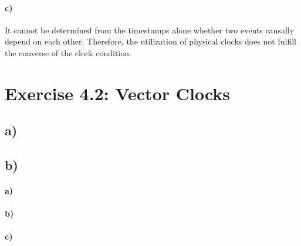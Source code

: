 \documentclass[12pt,a4paper]{article}
\begin{document}
  	\paragraph{c)} It cannot be determined from the timestamps alone whether two events causally depend on each other. Therefore, the utilization of physical clocks does not fulfill the converse of the clock condition.
  	
\section{Exercise 4.2: Vector Clocks}
	\subsection*{a)} %
	\subsection*{b)} %
		\paragraph{a)}
		\paragraph{b)}
		\paragraph{c)}
\end{document}
